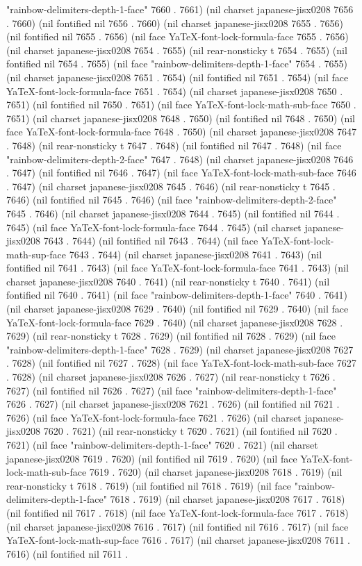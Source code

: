 "rainbow-delimiters-depth-1-face" 7660 . 7661) (nil charset japanese-jisx0208 7656 . 7660) (nil fontified nil 7656 . 7660) (nil charset japanese-jisx0208 7655 . 7656) (nil fontified nil 7655 . 7656) (nil face YaTeX-font-lock-formula-face 7655 . 7656) (nil charset japanese-jisx0208 7654 . 7655) (nil rear-nonsticky t 7654 . 7655) (nil fontified nil 7654 . 7655) (nil face "rainbow-delimiters-depth-1-face" 7654 . 7655) (nil charset japanese-jisx0208 7651 . 7654) (nil fontified nil 7651 . 7654) (nil face YaTeX-font-lock-formula-face 7651 . 7654) (nil charset japanese-jisx0208 7650 . 7651) (nil fontified nil 7650 . 7651) (nil face YaTeX-font-lock-math-sub-face 7650 . 7651) (nil charset japanese-jisx0208 7648 . 7650) (nil fontified nil 7648 . 7650) (nil face YaTeX-font-lock-formula-face 7648 . 7650) (nil charset japanese-jisx0208 7647 . 7648) (nil rear-nonsticky t 7647 . 7648) (nil fontified nil 7647 . 7648) (nil face "rainbow-delimiters-depth-2-face" 7647 . 7648) (nil charset japanese-jisx0208 7646 . 7647) (nil fontified nil 7646 . 7647) (nil face YaTeX-font-lock-math-sub-face 7646 . 7647) (nil charset japanese-jisx0208 7645 . 7646) (nil rear-nonsticky t 7645 . 7646) (nil fontified nil 7645 . 7646) (nil face "rainbow-delimiters-depth-2-face" 7645 . 7646) (nil charset japanese-jisx0208 7644 . 7645) (nil fontified nil 7644 . 7645) (nil face YaTeX-font-lock-formula-face 7644 . 7645) (nil charset japanese-jisx0208 7643 . 7644) (nil fontified nil 7643 . 7644) (nil face YaTeX-font-lock-math-sup-face 7643 . 7644) (nil charset japanese-jisx0208 7641 . 7643) (nil fontified nil 7641 . 7643) (nil face YaTeX-font-lock-formula-face 7641 . 7643) (nil charset japanese-jisx0208 7640 . 7641) (nil rear-nonsticky t 7640 . 7641) (nil fontified nil 7640 . 7641) (nil face "rainbow-delimiters-depth-1-face" 7640 . 7641) (nil charset japanese-jisx0208 7629 . 7640) (nil fontified nil 7629 . 7640) (nil face YaTeX-font-lock-formula-face 7629 . 7640) (nil charset japanese-jisx0208 7628 . 7629) (nil rear-nonsticky t 7628 . 7629) (nil fontified nil 7628 . 7629) (nil face "rainbow-delimiters-depth-1-face" 7628 . 7629) (nil charset japanese-jisx0208 7627 . 7628) (nil fontified nil 7627 . 7628) (nil face YaTeX-font-lock-math-sub-face 7627 . 7628) (nil charset japanese-jisx0208 7626 . 7627) (nil rear-nonsticky t 7626 . 7627) (nil fontified nil 7626 . 7627) (nil face "rainbow-delimiters-depth-1-face" 7626 . 7627) (nil charset japanese-jisx0208 7621 . 7626) (nil fontified nil 7621 . 7626) (nil face YaTeX-font-lock-formula-face 7621 . 7626) (nil charset japanese-jisx0208 7620 . 7621) (nil rear-nonsticky t 7620 . 7621) (nil fontified nil 7620 . 7621) (nil face "rainbow-delimiters-depth-1-face" 7620 . 7621) (nil charset japanese-jisx0208 7619 . 7620) (nil fontified nil 7619 . 7620) (nil face YaTeX-font-lock-math-sub-face 7619 . 7620) (nil charset japanese-jisx0208 7618 . 7619) (nil rear-nonsticky t 7618 . 7619) (nil fontified nil 7618 . 7619) (nil face "rainbow-delimiters-depth-1-face" 7618 . 7619) (nil charset japanese-jisx0208 7617 . 7618) (nil fontified nil 7617 . 7618) (nil face YaTeX-font-lock-formula-face 7617 . 7618) (nil charset japanese-jisx0208 7616 . 7617) (nil fontified nil 7616 . 7617) (nil face YaTeX-font-lock-math-sup-face 7616 . 7617) (nil charset japanese-jisx0208 7611 . 7616) (nil fontified nil 7611 . 